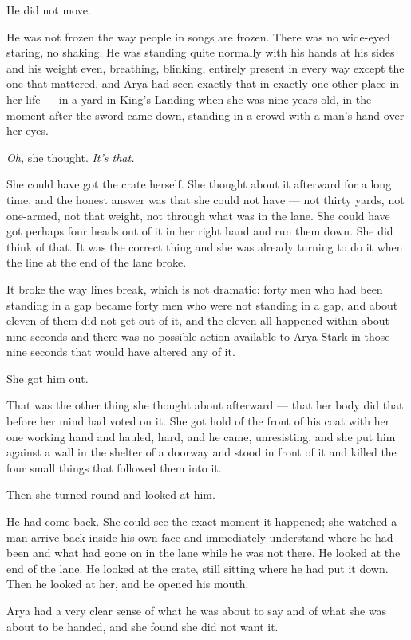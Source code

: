 He did not move.

He was not frozen the way people in songs are frozen. There was no wide-eyed staring, no shaking. He was standing quite normally with his hands at his sides and his weight even, breathing, blinking, entirely present in every way except the one that mattered, and Arya had seen exactly that in exactly one other place in her life — in a yard in King’s Landing when she was nine years old, in the moment after the sword came down, standing in a crowd with a man’s hand over her eyes.

\textit{Oh,} she thought. \textit{It’s that.}

She could have got the crate herself. She thought about it afterward for a long time, and the honest answer was that she could not have — not thirty yards, not one-armed, not that weight, not through what was in the lane. She could have got perhaps four heads out of it in her right hand and run them down. She did think of that. It was the correct thing and she was already turning to do it when the line at the end of the lane broke.

It broke the way lines break, which is not dramatic: forty men who had been standing in a gap became forty men who were not standing in a gap, and about eleven of them did not get out of it, and the eleven all happened within about nine seconds and there was no possible action available to Arya Stark in those nine seconds that would have altered any of it.

\sceneBreak

She got him out.

That was the other thing she thought about afterward — that her body did that before her mind had voted on it. She got hold of the front of his coat with her one working hand and hauled, hard, and he came, unresisting, and she put him against a wall in the shelter of a doorway and stood in front of it and killed the four small things that followed them into it.

Then she turned round and looked at him.

He had come back. She could see the exact moment it happened; she watched a man arrive back inside his own face and immediately understand where he had been and what had gone on in the lane while he was not there. He looked at the end of the lane. He looked at the crate, still sitting where he had put it down. Then he looked at her, and he opened his mouth.

Arya had a very clear sense of what he was about to say and of what she was about to be handed, and she found she did not want it.


